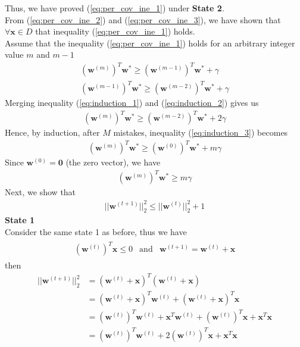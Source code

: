 Thus, we have proved (\ref{eq:per_cov_ine_1})  under \textbf{State 2}.\\
From (\ref{eq:per_cov_ine_2}) and (\ref{eq:per_cov_ine_3}), we have shown that $\forall \textbf{x}\in D$ that inequality (\ref{eq:per_cov_ine_1}) holds.\\
Assume that the inequality (\ref{eq:per_cov_ine_1}) holds for an arbitrary integer value $m$ and $m-1$
\begin{align}
  \label{eq:induction_1}
  (\textbf{w}^ {(m)})^T\textbf{w}^{*} \geq (\textbf{w}^ {(m-1)})^T\textbf{w}^{*} + \gamma \\
  \label{eq:induction_2}
  (\textbf{w}^ {(m-1)})^T\textbf{w}^{*} \geq (\textbf{w}^ {(m-2)})^T\textbf{w}^{*} + \gamma 
\end{align}
Merging inequality (\ref{eq:induction_1}) and (\ref{eq:induction_2}) gives us
\begin{align}
  \label{eq:induction_3}
  (\textbf{w}^ {(m)})^T\textbf{w}^{*} \geq (\textbf{w}^ {(m-2)})^T\textbf{w}^{*} + 2\gamma
\end{align}
Hence, by induction, after $M$ mistakes, inequality (\ref{eq:induction_3}) becomes
\begin{align}
  \label{eq:induction_starts}
  (\textbf{w}^ {(m)})^T\textbf{w}^{*} \geq (\textbf{w}^ {(0)})^T\textbf{w}^{*} + m\gamma
\end{align}
Since $\textbf{w}^{(0)} = \mathbf{0}$ (the zero vector), we have
\begin{align}
  \label{eq:perp_cov_result1}
  (\textbf{w}^ {(m)})^T\textbf{w}^{*} \geq m\gamma
\end{align}
Next, we show that 
\begin{align}
  ||{\textbf{w}^{(t+1)}}||_{2}^{2} \leq ||{\textbf{w}^{(t)}}||_{2}^{2} + 1
  \label{eq:induction_proof_part2}
\end{align}
\indent \textbf{State 1} \\
Consider the same state 1 as before, thus we have
\begin{align}
  \begin{matrix}
    \label{eq:state1_conditions}
    (\textbf{w}^ {(t)})^T\textbf{x} \leq 0 & \text{and} & \textbf{w}^ {(t+1)} = \textbf{w}^{(t)} + \textbf{x}
  \end{matrix}
\end{align}
then
\begin{align}
  \nonumber
  ||\textbf{w}^{(t+1)}||_{2}^{2} &= ( \textbf{w}^{(t)} + \textbf{x})^T( \textbf{w}^{(t)} + \textbf{x}) \\
  \nonumber
  &=( \textbf{w}^{(t)} + \textbf{x})^T\textbf{w}^{(t)} + ( \textbf{w}^{(t)} + \textbf{x})^T\textbf{x} \\
  \nonumber
  &= (\textbf{w}^{(t)})^T\textbf{w}^{(t)} + \textbf{x}^T\textbf{w}^{(t)} + (\textbf{w}^{(t)})^T\textbf{x} + \textbf{x}^T\textbf{x}\\
  &= (\textbf{w}^{(t)})^T\textbf{w}^{(t)} + 2 (\textbf{w}^{(t)})^T\textbf{x}  + \textbf{x}^T\textbf{x}
  \label{eq:state_1_proof}
\end{align}
